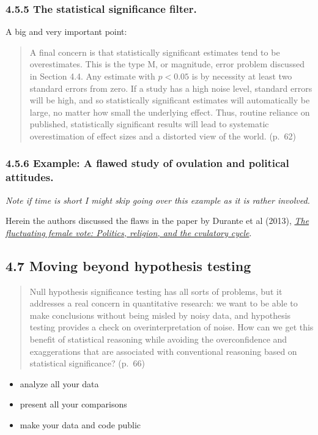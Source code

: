 \documentclass[
]{article}
\providecommand{\tightlist}{%
  \setlength{\itemsep}{0pt}\setlength{\parskip}{0pt}}
\begin{document}
\hypertarget{the-statistical-significance-filter.}{%
\subsubsection{4.5.5 The statistical significance
filter.}\label{the-statistical-significance-filter.}}

A big and very important point:

\begin{quote}
A final concern is that statistically significant estimates tend to be
overestimates. This is the type M, or magnitude, error problem discussed
in Section 4.4. Any estimate with \(p < 0.05\) is by necessity at least
two standard errors from zero. If a study has a high noise level,
standard errors will be high, and so statistically significant estimates
will automatically be large, no matter how small the underlying effect.
Thus, routine reliance on published, statistically significant results
will lead to systematic overestimation of effect sizes and a distorted
view of the world. (p.~62)
\end{quote}

\hypertarget{example-a-flawed-study-of-ovulation-and-political-attitudes.}{%
\subsubsection{4.5.6 Example: A flawed study of ovulation and political
attitudes.}\label{example-a-flawed-study-of-ovulation-and-political-attitudes.}}

\emph{Note if time is short I might skip going over this example as it
is rather involved.}

Herein the authors discussed the flaws in the paper by Durante et al
(2013),
\href{https://journals.sagepub.com/doi/abs/10.1177/0956797612466416}{\emph{The
fluctuating female vote: Politics, religion, and the cvulatory cycle}}.

\hypertarget{moving-beyond-hypothesis-testing}{%
\subsection{4.7 Moving beyond hypothesis
testing}\label{moving-beyond-hypothesis-testing}}

\begin{quote}
Null hypothesis significance testing has all sorts of problems, but it
addresses a real concern in quantitative research: we want to be able to
make conclusions without being misled by noisy data, and hypothesis
testing provides a check on overinterpretation of noise. How can we get
this benefit of statistical reasoning while avoiding the overconfidence
and exaggerations that are associated with conventional reasoning based
on statistical significance? (p.~66)
\end{quote}

\begin{itemize}
\tightlist
\item
  analyze all your data
\item
  present all your comparisons
\item
  make your data and code public
\end{itemize}
\end{document}

